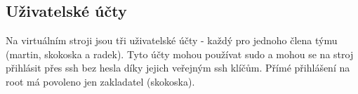 \subsection{Uživatelské účty}
Na virtuálním stroji jsou tři uživatelské účty - každý pro jednoho člena týmu (martin, skokoska a radek). Tyto účty mohou používat sudo a mohou se na stroj přihlásit přes ssh bez hesla díky jejich veřejným ssh klíčům.
Přímé přihlášení na root má povoleno jen zakladatel (skokoska).
